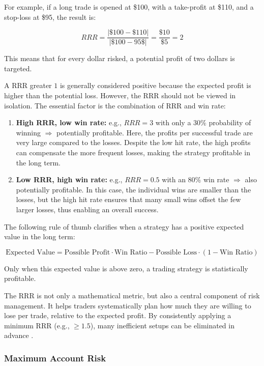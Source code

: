 \noindent
For example, if a long trade is opened at \$100, with a take-profit at \$110, and a stop-loss at \$95, the result is:

\[
    RRR = \frac{|\$100 - \$110|}{|\$100 - 95\$|} = \frac{\$10}{\$5} = 2
\]

\noindent
This means that for every dollar risked, a potential profit of two dollars is targeted.

A RRR greater $1$ is generally considered positive because the expected profit is higher than the potential loss.
However, the RRR should not be viewed in isolation.
The essential factor is the combination of RRR and win rate:

\begin{enumerate}
    \item \textbf{High RRR, low win rate:} e.g., $RRR=3$ with only a 30\% probability of winning $\Rightarrow$ potentially profitable.
    Here, the profits per successful trade are very large compared to the losses.
    Despite the low hit rate, the high profits can compensate the more frequent losses, making the strategy profitable in the long term.
    \item \textbf{Low RRR, high win rate:} e.g., $RRR=0.5$ with an 80\% win rate $\Rightarrow$ also potentially profitable.
    In this case, the individual wins are smaller than the losses, but the high hit rate ensures that many small wins offset the few larger losses, thus enabling an overall success.
\end{enumerate}

\noindent
The following rule of thumb clarifies when a strategy has a positive expected value in the long term:

\[
    \text{Expected Value} = \text{Possible Profit} \cdot \text{Win Ratio} - \text{Possible Loss} \cdot (1 - \text{Win Ratio})
\]

\noindent
Only when this expected value is above zero, a trading strategy is statistically profitable.

The RRR is not only a mathematical metric, but also a central component of risk management.
It helps traders systematically plan how much they are willing to lose per trade, relative to the expected profit.
By consistently applying a minimum RRR (e.g., $\ge 1.5$), many inefficient setups can be eliminated in advance \cite{bitpanda-crv}.

\subsubsection{Maximum Account Risk}

